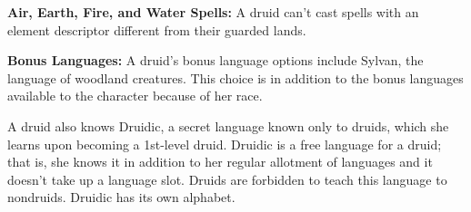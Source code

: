 \textbf{Air, Earth, Fire, and Water Spells:} A druid can't cast spells with an element descriptor different from their guarded lands.


\textbf{Bonus Languages:} A druid's bonus language options include Sylvan, the language of woodland creatures. This choice is in addition to the bonus languages available to the character because of her race.

A druid also knows Druidic, a secret language known only to druids, which she learns upon becoming a 1st-level druid. Druidic is a free language for a druid; that is, she knows it in addition to her regular allotment of languages and it doesn't take up a language slot. Druids are forbidden to teach this language to nondruids. Druidic has its own alphabet.



